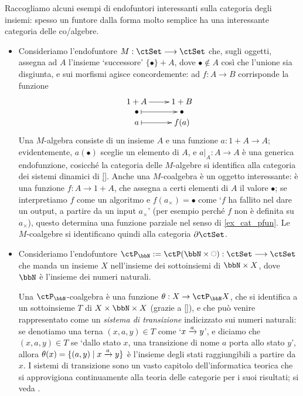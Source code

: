 \begin{examples}
	Raccogliamo alcuni esempi di endofuntori interessanti sulla categoria degli insiemi: spesso un funtore dalla forma molto semplice ha una interessante categoria delle co/algebre.
	\begin{itemize}
		\item Consideriamo l'endofuntore \(M : \ctSet\fun\ctSet\) che, sugli oggetti, assegna ad \(A\) l'insieme `successore' \(\{\bullet\}+A\), dove \(\bullet\notin A\) così che l'unione sia disgiunta, e sui morfismi agisce concordemente: ad \(f : A\to B\) corrisponde la funzione
		      \[\xymatrix@R=0mm{
			      1+A \ar[r] & 1+B \\
			      \bullet \ar@{|->}[r] & \bullet \\
			      a \ar@{|->}[r] & f(a)
			      }\]
		      Una \(M\)-algebra consiste di un insieme \(A\) e una funzione \(a : 1+A\to A\); evidentemente, \(a(\bullet)\) sceglie un elemento di \(A\), e \(a|_A : A\to A\) è una generica endofunzione, cosicché la categoria delle \(M\)-algebre si identifica alla categoria dei sistemi dinamici di \ref{}. Anche una \(M\)-coalgebra è un oggetto interessante: è una funzione \(f : A\to 1+A\), che assegna a certi elementi di \(A\) il valore \(\bullet\); se interpretiamo \(f\) come un algoritmo e \(f(a_\times)=\bullet\) come `\(f\) ha fallito nel dare un output, a partire da un input \(a_\times\)' (per esempio perché \(f\) non è definita su \(a_\times\)), questo determina una funzione parziale nel senso di \ref{ex_cat_pfun}. Le \(M\)-coalgebre si identificano quindi alla categoria \(\pSet\).
		\item Consideriamo l'endofuntore \(\ctP_\bbN:=\ctP(\bbN\times\blank):\ctSet\fun\ctSet\) che manda un insieme \(X\) nell'insieme dei sottoinsiemi di \(\bbN\times X\), dove \(\bbN\) è l'insieme dei numeri naturali.

		      Una \(\ctP_\bbN\)-coalgebra è una funzione \(\theta : X\to \ctP_\bbN X\), che si identifica a un sottoinsieme \(T\) di \(X\times\bbN\times X\) (grazie a \ref{}), e che può venire rappresentato come un \emph{sistema di transizione} indicizzato sui numeri naturali: se denotiamo una terna \((x,a,y)\in T\) come `\(x\xrightarrow{a}y\)', e diciamo che \((x,a,y)\in T\) se `dallo stato \(x\), una transizione di nome \(a\) porta allo stato \(y\)', allora \(\theta(x) = \{(a,y)\mid x\xrightarrow{a}y\}\) è l'insieme degli stati raggiungibili a partire da \(x\). I sistemi di transizione sono un vasto capitolo dell'informatica teorica che si approvigiona continuamente alla teoria delle categorie per i suoi risultati; si veda \cite{sangiorgi2011introduction,sangiorgi2012advanced,Jacobs2016}.


\end{itemize}
\end{examples}
